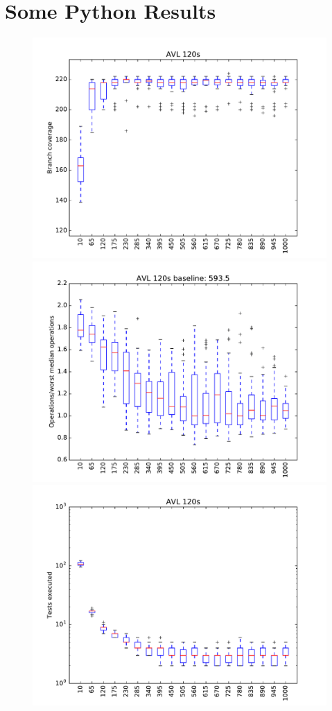 \section{Some Python Results}

\begin{figure}
\includegraphics[width=\columnwidth]{graphs/AVLrand120}
\includegraphics[width=\columnwidth]{graphs/opsavlrand120}
\includegraphics[width=\columnwidth]{graphs/execavlrand120}

\end{figure}

